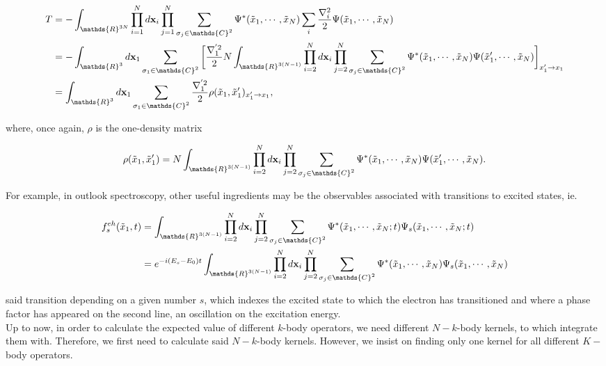 \documentclass{homework}
\begin{document}
\begin{align}
     T &= -\int_{\mathds{R}^{3N}} \prod_{i=1}^N d{\bf x}_i \prod_{j=1}^{N} \sum_{\sigma_j \in \mathds{C}^2} \Psi^{*}(\tilde{x}_1, \cdots, \tilde{x}_N)
     \sum_{i}\frac{\nabla^{2}_{i}}{2}
     \Psi(\tilde{x}_1, \cdots, \tilde{x}_N) \\
     &= - \int_{\mathds{R}^{3}} d{\bf x}_1 \sum_{\sigma_1 \in \mathds{C}^2} \bigg[\frac{\nabla^{'2}_1}{2} N \int_{\mathds{R}^{3(N-1)}} \prod_{i=2}^N d{\bf x}_i \prod_{j=2}^{N} \sum_{\sigma_j \in \mathds{C}^2} \Psi^{*}(\tilde{x}_1, \cdots, \tilde{x}_N) \Psi(\tilde{x}'_1, \cdots, \tilde{x}_N)\bigg]_{{x'_1 \rightarrow x_1}} \\
     &= \int_{\mathds{R}^{3}} d{\bf x}_1 \sum_{\sigma_1 \in \mathds{C}^2} \frac{\nabla^{'2}_1}{2} {\rho}(\tilde{x}_1, \tilde{x}'_1)_{{x'_1 \rightarrow x_1}},
\end{align}

where, once again, $\rho$ is the one-density matrix 

$$
{\rho}(\tilde{x}_1, \tilde{x}'_1) =  N \int_{\mathds{R}^{3(N-1)}} \prod_{i=2}^N d{\bf x}_i \prod_{j=2}^{N} \sum_{\sigma_j \in \mathds{C}^2} \Psi^{*}(\tilde{x}_1, \cdots, \tilde{x}_N) \Psi(\tilde{x}'_1, \cdots, \tilde{x}_N).
$$

For example, in outlook spectroscopy, other useful ingredients may be the observables associated with transitions to excited states, ie.

\begin{align}
f_{s}^{eh}(\tilde{x}_1, t) &= \int_{\mathds{R}^{3(N-1)}} \prod_{i=2}^N d{\bf x}_i \prod_{j=2}^{N} \sum_{\sigma_j \in \mathds{C}^2} \Psi^{*}(\tilde{x}_1, \cdots, \tilde{x}_N; t) \Psi_{s}(\tilde{x}_1, \cdots, \tilde{x}_N; t) \\
&= e^{-i(E_s-E_0)t} \int_{\mathds{R}^{3(N-1)}} \prod_{i=2}^N d{\bf x}_i \prod_{j=2}^{N} \sum_{\sigma_j \in \mathds{C}^2} \Psi^{*}(\tilde{x}_1, \cdots, \tilde{x}_N) \Psi_{s}(\tilde{x}_1, \cdots, \tilde{x}_N) 
\end{align}

said transition depending on a given number $s$, which indexes the excited state to which the electron has transitioned and where a phase factor has appeared on the second line, an oscillation on the excitation energy. \\

Up to now, in order to calculate the expected value of different $k$-body operators, we need different $N-k$-body kernels, to which integrate them with. Therefore, we first need to calculate said $N-k$-body kernels. However, we insist on finding only one kernel for all different $K-$body operators. \\
\end{document}
